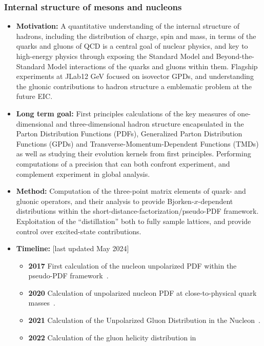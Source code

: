 \documentclass[12pt,hyperpdf]{article}
\begin{document}
    
\subsubsection{Internal structure of mesons and nucleons}\label{sec:meshadstruct}
\begin{itemize}
  \item{\bf Motivation:} A quantitative understanding of the internal
     structure of hadrons, including the distribution of charge, spin
     and mass, in terms of the quarks and gluons of QCD is a central
     goal of nuclear physics, and key to high-energy physics through
     exposing the Standard Model and Beyond-the-Standard Model
     interactions of the quarks and gluons within them.  Flagship
     experiments at JLab\@12 GeV focused on isovector GPDs, and
     understanding the gluonic contributions to hadron structure a
     emblematic problem at the future EIC.
   \item{\bf Long term goal:} First principles calculations of the key
     measures of one-dimensional and three-dimensional hadron
     structure encapsulated in the Parton Distribution Functions (PDFs),
     Generalized Parton Distribution Functions (GPDs) and
     Transverse-Momentum-Dependent Functions (TMDs) as well as studying their evolution kernels from first principles.  Performing
     computations of a precision that can both confront experiment,
     and complement experiment in global analysis.
   \item{\bf Method:} Computation of the three-point matrix elements of quark- and
     gluonic operators, and their analysis to provide
     Bjorken-$x$-dependent distributions within the
     short-distance-factorization/pseudo-PDF framework.  Exploitation
     of the ``distillation'' both to fully sample lattices, and
     provide control over excited-state contributions.
\item{\bf Timeline:} \hfill [last updated May 2024]
\begin{itemize}
   \item{\bf 2017} First calculation of the nucleon unpolarized PDF within
     the pseudo-PDF framework~\cite{Orginos:2017kos}.
   \item{\bf 2020} Calculation of unpolarized nucleon PDF at close-to-physical
     quark masses~\cite{Joo:2020spy}.
   \item{\bf 2021} Calculation of the Unpolarized Gluon Distribution in
     the Nucleon~\cite{HadStruc:2021wmh}.
   \item{\bf 2022} Calculation of the gluon helicity distribution in

\end{itemize}
\end{itemize}
\end{document}
